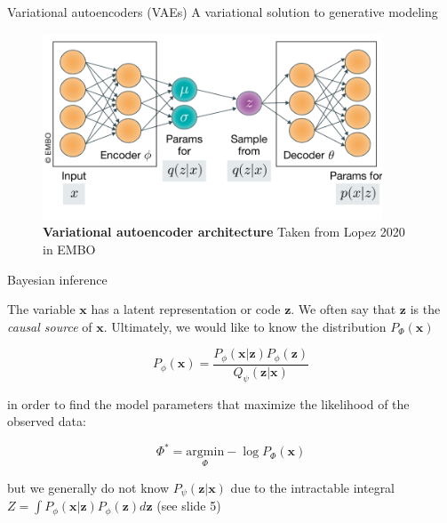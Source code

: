 \documentclass{beamer}					%
\begin{document}
\begin{frame}{Variational autoencoders (VAEs)}
A variational solution to generative modeling

\begin{center}
\begin{figure}
\includegraphics[width=0.9\textwidth]{vae}
\caption{\textbf{Variational autoencoder architecture} Taken from Lopez 2020 in EMBO}
\end{figure}
\end{center}
\end{frame}


\begin{frame}{Bayesian inference}

The variable $\mathbf{x}$ has a latent representation or code $\mathbf{z}$. We often say that $\mathbf{z}$ is the \emph{causal source} of $\mathbf{x}$. Ultimately, we would like to know the distribution $P_{\Phi}(\mathbf{x})$

\begin{equation*}
P_{\phi}(\mathbf{x}) = \frac{P_{\phi}(\mathbf{x|z})P_{\phi}(\mathbf{z})}{Q_{\psi}(\mathbf{z|x})}
\end{equation*}

in order to find the model parameters that maximize the likelihood of the observed data:

\begin{equation*}
\Phi^{*} = \underset{\Phi}{\mathrm{argmin}} -\log P_{\Phi}(\mathbf{x}) 
\end{equation*}

but we generally do not know $P_{\psi}(\mathbf{z|x})$ due to the intractable integral $Z = \int P_{\phi}(\mathbf{x|z})P_{\phi}(\mathbf{z})d\mathbf{z}$ (see slide 5)

\end{frame}
\end{document}
